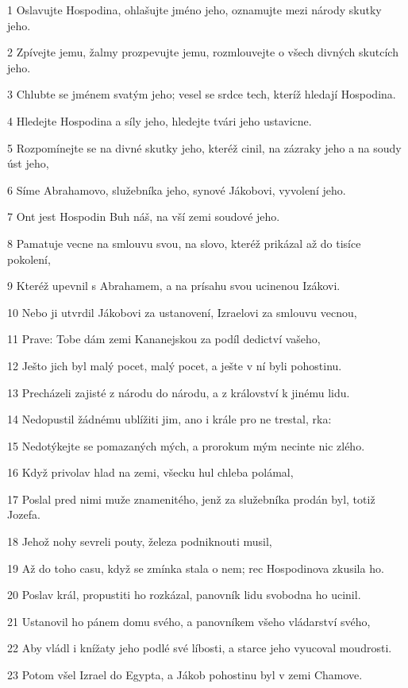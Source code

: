 \par 1 Oslavujte Hospodina, ohlašujte jméno jeho, oznamujte mezi národy skutky jeho.
\par 2 Zpívejte jemu, žalmy prozpevujte jemu, rozmlouvejte o všech divných skutcích jeho.
\par 3 Chlubte se jménem svatým jeho; vesel se srdce tech, kteríž hledají Hospodina.
\par 4 Hledejte Hospodina a síly jeho, hledejte tvári jeho ustavicne.
\par 5 Rozpomínejte se na divné skutky jeho, kteréž cinil, na zázraky jeho a na soudy úst jeho,
\par 6 Síme Abrahamovo, služebníka jeho, synové Jákobovi, vyvolení jeho.
\par 7 Ont jest Hospodin Buh náš, na vší zemi soudové jeho.
\par 8 Pamatuje vecne na smlouvu svou, na slovo, kteréž prikázal až do tisíce pokolení,
\par 9 Kteréž upevnil s Abrahamem, a na prísahu svou ucinenou Izákovi.
\par 10 Nebo ji utvrdil Jákobovi za ustanovení, Izraelovi za smlouvu vecnou,
\par 11 Prave: Tobe dám zemi Kananejskou za podíl dedictví vašeho,
\par 12 Ješto jich byl malý pocet, malý pocet, a ješte v ní byli pohostinu.
\par 13 Precházeli zajisté z národu do národu, a z království k jinému lidu.
\par 14 Nedopustil žádnému ublížiti jim, ano i krále pro ne trestal, rka:
\par 15 Nedotýkejte se pomazaných mých, a prorokum mým necinte nic zlého.
\par 16 Když privolav hlad na zemi, všecku hul chleba polámal,
\par 17 Poslal pred nimi muže znamenitého, jenž za služebníka prodán byl, totiž Jozefa.
\par 18 Jehož nohy sevreli pouty, železa podniknouti musil,
\par 19 Až do toho casu, když se zmínka stala o nem; rec Hospodinova zkusila ho.
\par 20 Poslav král, propustiti ho rozkázal, panovník lidu svobodna ho ucinil.
\par 21 Ustanovil ho pánem domu svého, a panovníkem všeho vládarství svého,
\par 22 Aby vládl i knížaty jeho podlé své líbosti, a starce jeho vyucoval moudrosti.
\par 23 Potom všel Izrael do Egypta, a Jákob pohostinu byl v zemi Chamove.
